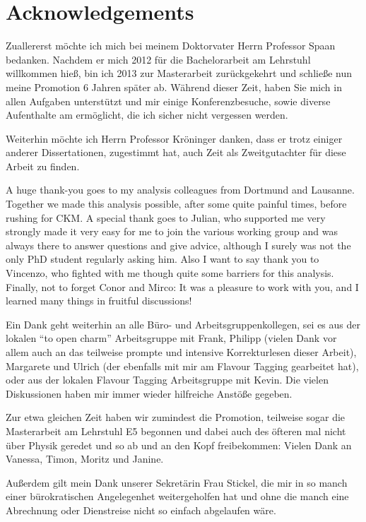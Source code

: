 \chapter{Acknowledgements}

Zuallererst möchte ich mich bei meinem Doktorvater Herrn Professor Spaan bedanken.
Nachdem er mich \num{2012} für die Bachelorarbeit am Lehrstuhl willkommen hieß, bin ich \num{2013} zur Masterarbeit zurückgekehrt und schließe nun meine Promotion \num{6} Jahren später ab.
Während dieser Zeit, haben Sie mich in allen Aufgaben unterstützt und mir einige Konferenzbesuche, sowie diverse Aufenthalte am \cern ermöglicht, die ich sicher nicht vergessen werden.

Weiterhin möchte ich Herrn Professor Kröninger danken, dass er trotz einiger anderer Dissertationen, zugestimmt hat, auch Zeit als Zweitgutachter für diese Arbeit zu finden.

A huge thank-you goes to my analysis colleagues from Dortmund and Lausanne.
Together we made this analysis possible, after some quite painful times, \eg before rushing for CKM.
A special thank goes to Julian, who supported me very strongly made it very easy for me to join the various \lhcb working group and was always there to answer questions and give advice, although I surely was not the only PhD student regularly asking him.
Also I want to say thank you to Vincenzo, who fighted with me though quite some barriers for this analysis.
Finally, not to forget Conor and Mirco: It was a pleasure to work with you, and I learned many things in fruitful discussions!

Ein Dank geht weiterhin an alle Büro- und Arbeitsgruppenkollegen, sei es aus der lokalen \enquote{\B to open charm} Arbeitsgruppe mit Frank, Philipp (vielen Dank vor allem auch an das teilweise prompte und intensive Korrekturlesen dieser Arbeit), Margarete und Ulrich (der ebenfalls mit mir am Flavour Tagging gearbeitet hat), oder aus der lokalen Flavour Tagging Arbeitsgruppe mit Kevin.
Die vielen Diskussionen haben mir immer wieder hilfreiche Anstöße gegeben.

Zur etwa gleichen Zeit haben wir zumindest die Promotion, teilweise sogar die Masterarbeit am Lehrstuhl E5 begonnen und dabei auch des öfteren mal nicht über Physik geredet und so ab und an den Kopf freibekommen: Vielen Dank an Vanessa, Timon, Moritz und Janine.

Außerdem gilt mein Dank unserer Sekretärin Frau Stickel, die mir in so manch einer bürokratischen Angelegenhet weitergeholfen hat und ohne die manch eine Abrechnung oder Dienstreise nicht so einfach abgelaufen wäre.

